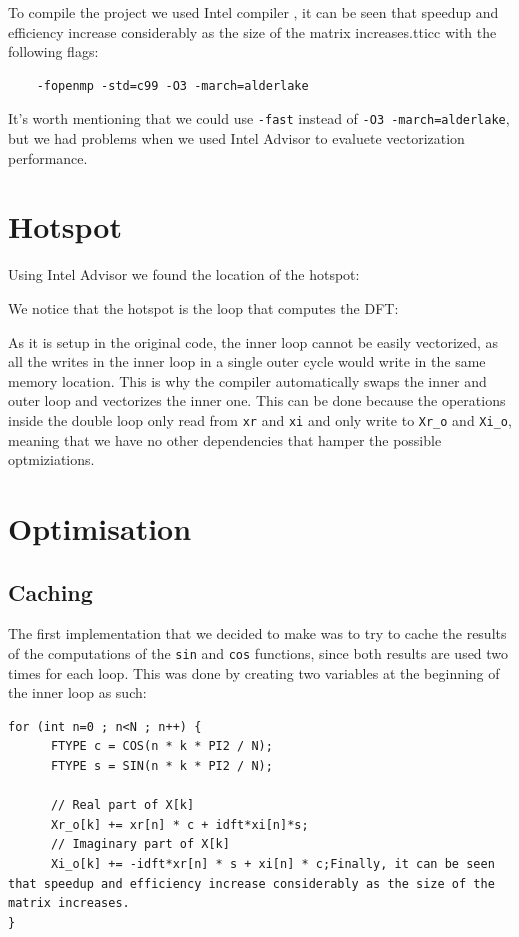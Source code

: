 \documentclass{article}
\begin{document}
To compile the project we used Intel compiler \textFinally, it can be seen that speedup and efficiency increase considerably as the size of the matrix increases.tt{icc} with the following flags: 
\begin{verbatim}
    -fopenmp -std=c99 -O3 -march=alderlake
\end{verbatim}
It's worth mentioning that we could use \verb|-fast| instead of \verb|-O3 -march=alderlake|, but we had problems when we used Intel Advisor to evaluete vectorization performance.

\section{Hotspot}
Using Intel Advisor we found the location of the hotspot:


We notice that the hotspot is the loop that computes the DFT:


As it is setup in the original code, the inner loop cannot be easily vectorized, as all the writes in the inner loop in a single outer cycle would write in the same memory location. This is why the compiler automatically swaps the inner and outer loop and vectorizes the inner one. This can be done because the operations inside the double loop only read from \verb|xr| and \verb|xi| and only write to \verb|Xr_o| and \verb|Xi_o|, meaning that we have no other dependencies that hamper the possible optmiziations.

\section{Optimisation}

\subsection{Caching}

The first implementation that we decided to make was to try to cache the results of the computations of the \verb|sin| and \verb|cos| functions, since both results are used two times for each loop. This was done by creating two variables at the beginning of the inner loop as such:
\begin{verbatim}
for (int n=0 ; n<N ; n++) {
      FTYPE c = COS(n * k * PI2 / N);
      FTYPE s = SIN(n * k * PI2 / N);

      // Real part of X[k]
      Xr_o[k] += xr[n] * c + idft*xi[n]*s;
      // Imaginary part of X[k]
      Xi_o[k] += -idft*xr[n] * s + xi[n] * c;Finally, it can be seen that speedup and efficiency increase considerably as the size of the matrix increases.
}
\end{verbatim}
\end{document}
